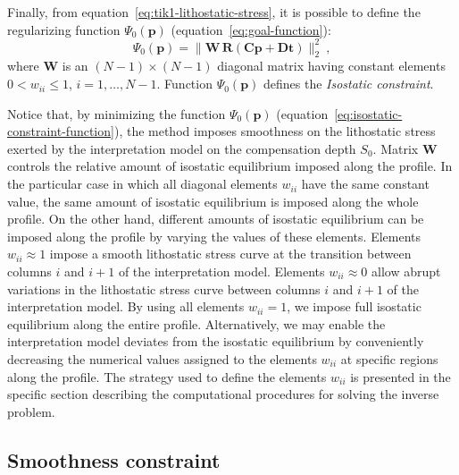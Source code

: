 \documentclass[manuscript]{geophysics}
\begin{document}
Finally, from equation~\ref{eq:tik1-lithostatic-stress}, it is possible to
define the regularizing function $\Psi_{0}(\mathbf{p})$ 
(equation~\ref{eq:goal-function}): 
\begin{equation}
\Psi_{0}(\mathbf{p}) = \| \mathbf{W} \, \mathbf{R} \left( \mathbf{C} \mathbf{p} + \mathbf{D}
\mathbf{t} \right) \|_{2}^{2} \: ,
\label{eq:isostatic-constraint-function}
\end{equation}
where $\mathbf{W}$ is an $(N - 1) \times (N - 1)$ diagonal matrix having constant
elements $0 < w_{ii} \le 1$, $i = 1, \dots, N - 1$. 
Function $\Psi_{0}(\mathbf{p})$ defines the \textit{Isostatic constraint}.

Notice that, by minimizing the function $\Psi_{0}(\mathbf{p})$ 
(equation~\ref{eq:isostatic-constraint-function}), the method imposes smoothness on 
the lithostatic stress exerted by the interpretation model on the 
compensation depth $S_{0}$.
Matrix $\mathbf{W}$ controls the relative amount of isostatic equilibrium imposed 
along the profile. 
In the particular case in which all diagonal elements $w_{ii}$ have the same
constant value, the same amount of isostatic equilibrium is imposed along the 
whole profile. On the other hand, different amounts of isostatic equilibrium
can be imposed along the profile by varying the values of these elements.
Elements $w_{ii} \approx 1$ impose a smooth lithostatic stress curve 
at the transition between columns $i$ and $i+1$ of the interpretation model.
Elements $w_{ii} \approx 0$ allow abrupt variations in the lithostatic stress 
curve between columns $i$ and $i+1$ of the interpretation model.
By using all elements $w_{ii} = 1$, we impose full isostatic equilibrium 
along the entire profile. Alternatively, we may enable the interpretation model 
deviates from the isostatic equilibrium by conveniently decreasing the numerical values
assigned to the elements $w_{ii}$ at specific regions along the profile. 
The strategy used to define the elements $w_{ii}$ is 
presented in the specific section describing the computational procedures
for solving the inverse problem.


\subsection{Smoothness constraint}
\end{document}
